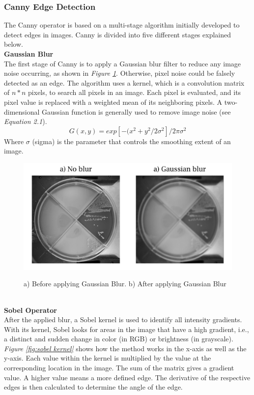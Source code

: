 \subsubsection{Canny Edge Detection}
The Canny operator \cite{Xuan} is based on a multi-stage algorithm initially developed to detect edges in images. Canny is divided into five different stages explained below. \\

\noindent \textbf{Gaussian Blur}\\
The first stage of Canny is to apply a Gaussian blur filter to reduce any image noise occurring, as shown in \textit{Figure \ref{fig:gaussian blur}}.
Otherwise, pixel noise could be falsely detected as an edge. The algorithm uses a kernel, which is a convolution matrix of $n*n$ pixels, to search all pixels in an image. Each pixel is evaluated, and its pixel value is replaced with a weighted mean of its neighboring pixels. A two-dimensional Gaussian function is generally used to remove image noise (see \textit{Equation 2.1}). \begin{equation} G(x,y)=exp[-(x^2+y^2/2\sigma^2]/2\pi\sigma^2\end{equation} Where $\sigma$ (sigma) is the parameter that controls the smoothing extent of an image.

\begin{figure}[H]
        \centering
        \includegraphics[width=.55\linewidth]{figures/PDF/Gaussian_blur.pdf}\\
        \caption{a) Before applying Gaussian Blur. b) After applying Gaussian Blur}
        \label{fig:gaussian blur}
\end{figure}\\

\noindent \textbf{Sobel Operator}\\
\noindent After the applied blur, a Sobel kernel is used to identify all intensity gradients. With its kernel, Sobel looks for areas in the image that have a high gradient, i.e., a distinct and sudden change in color (in RGB) or brightness (in grayscale). \textit{Figure \ref{fig:sobel kernel}} shows how the method works in the x-axis as well as the y-axis. Each value within the kernel is multiplied by the value at the corresponding location in the image. The sum of the matrix gives a gradient value. A higher value means a more defined edge. The derivative of the respective edges is then calculated to determine the angle of the edge.\\

